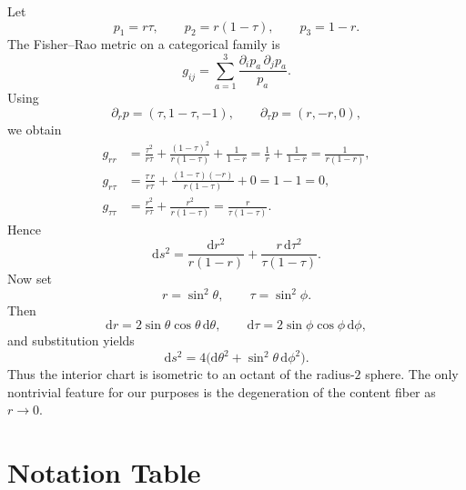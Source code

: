 \documentclass[11pt]{article}
\newcommand{\1}{\mathbf{1}}
\begin{document}
Let
\[
p_1=r\tau,
\qquad
p_2=r(1-\tau),
\qquad
p_3=1-r.
\]
The Fisher--Rao metric on a categorical family is
\[
g_{ij}=\sum_{a=1}^3 \frac{\partial_i p_a\,\partial_j p_a}{p_a}.
\]
Using
\[
\partial_r p=(\tau,1-\tau,-1),
\qquad
\partial_\tau p=(r,-r,0),
\]
we obtain
\begin{align*}
g_{rr}
&=\frac{\tau^2}{r\tau}+\frac{(1-\tau)^2}{r(1-\tau)}+\frac{1}{1-r}
=\frac{1}{r}+\frac{1}{1-r}
=\frac{1}{r(1-r)},\\
g_{r\tau}
&=\frac{\tau\,r}{r\tau}+\frac{(1-\tau)(-r)}{r(1-\tau)}+0
=1-1=0,\\
g_{\tau\tau}
&=\frac{r^2}{r\tau}+\frac{r^2}{r(1-\tau)}
=\frac{r}{\tau(1-\tau)}.
\end{align*}
Hence
\[
\mathrm{d}s^2=\frac{\mathrm{d}r^2}{r(1-r)}+\frac{r\,\mathrm{d}\tau^2}{\tau(1-\tau)}.
\]
Now set
\[
r=\sin^2\theta,
\qquad
\tau=\sin^2\phi.
\]
Then
\[
\mathrm{d}r=2\sin\theta\cos\theta\,\mathrm{d}\theta,
\qquad
\mathrm{d}\tau=2\sin\phi\cos\phi\,\mathrm{d}\phi,
\]
and substitution yields
\[
\mathrm{d}s^2=4\bigl(\mathrm{d}\theta^2+\sin^2\theta\,\mathrm{d}\phi^2\bigr).
\]
Thus the interior chart is isometric to an octant of the radius-$2$ sphere. The only nontrivial feature for our purposes is the degeneration of the content fiber as $r\to 0$.

\section{Notation Table}
\label{app:notation}
\end{document}
